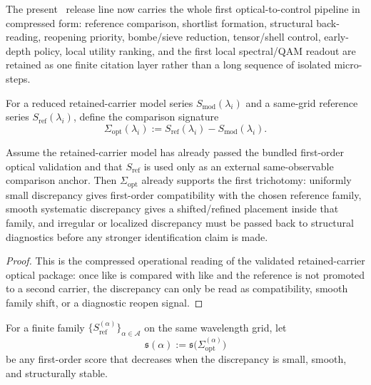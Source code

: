 \begin{remark}
\label{rem:status-of-the-compressed-optical-diagnostic-control-layer-in-v324}
The present \docversion\ release line now carries the whole first optical-to-control pipeline in compressed form: reference comparison, shortlist formation, structural back-reading, reopening priority, bombe/sieve reduction, tensor/shell control, early-depth policy, local utility ranking, and the first local spectral/QAM readout are retained as one finite citation layer rather than a long sequence of isolated micro-steps.
\end{remark}

\begin{definition}
\label{def:reference-comparison-optical-signature}
For a reduced retained-carrier model series $S_{\mathrm{mod}}(\lambda_i)$ and a same-grid reference series $S_{\mathrm{ref}}(\lambda_i)$, define the comparison signature
\[
\Sigma_{\mathrm{opt}}(\lambda_i):=S_{\mathrm{ref}}(\lambda_i)-S_{\mathrm{mod}}(\lambda_i).
\]
\end{definition}

\begin{proposition}
\label{prop:first-data-anchored-optical-comparison-principle}
Assume the retained-carrier model has already passed the bundled first-order optical validation and that $S_{\mathrm{ref}}$ is used only as an external same-observable comparison anchor. Then $\Sigma_{\mathrm{opt}}$ already supports the first trichotomy: uniformly small discrepancy gives first-order compatibility with the chosen reference family, smooth systematic discrepancy gives a shifted/refined placement inside that family, and irregular or localized discrepancy must be passed back to structural diagnostics before any stronger identification claim is made.
\end{proposition}

\begin{proof}
This is the compressed operational reading of the validated retained-carrier optical package: once like is compared with like and the reference is not promoted to a second carrier, the discrepancy can only be read as compatibility, smooth family shift, or a diagnostic reopen signal.
\end{proof}

\begin{definition}
\label{def:reference-family-comparison-score}
For a finite family $\{S_{\mathrm{ref}}^{(\alpha)}\}_{\alpha\in\mathcal A}$ on the same wavelength grid, let
\[
\mathfrak s(\alpha):=\mathfrak s\bigl(\Sigma^{(\alpha)}_{\mathrm{opt}}\bigr)
\]
be any first-order score that decreases when the discrepancy is small, smooth, and structurally stable.
\end{definition}

